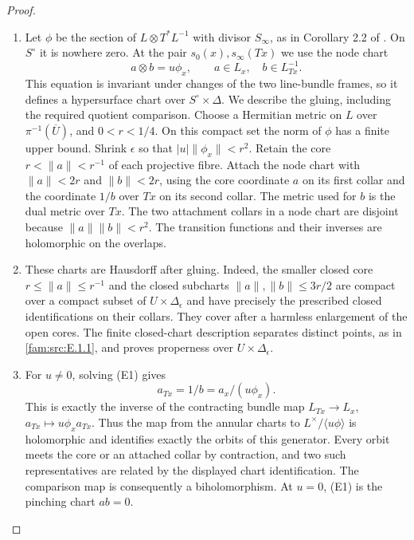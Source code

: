 \begin{proof}
\begin{enumerate}[label=\arabic*.,leftmargin=*]
\item Let $\phi$ be the section of $L\otimes T^*L^{-1}$ with divisor
$S_\infty$, as in Corollary 2.2 of \cite{Engel2026}. On $S^\circ$ it is
nowhere zero. At the pair $s_0(x),s_\infty(Tx)$ we use the node chart
\[
       a\otimes b=u\phi_x,
       \qquad a\in L_x,\quad b\in L^{-1}_{Tx}.                 \tag{E1}
\]
This equation is invariant under changes of the two line-bundle
frames, so it defines a hypersurface chart over $S^\circ\times\Delta$.
We describe the gluing, including the required quotient comparison.
Choose a Hermitian metric on $L$ over $\pi^{-1}(\overline U)$, and
$0<r<1/4$. On this compact set the norm of $\phi$ has a finite upper
bound. Shrink $\epsilon$ so that $|u|\|\phi_x\|<r^2$.
Retain the core $r<\|a\|<r^{-1}$ of each projective fibre. Attach the
node chart with $\|a\|<2r$ and $\|b\|<2r$, using the core coordinate
$a$ on its first collar and the coordinate $1/b$ over $Tx$ on its
second collar. The metric used for $b$ is the dual metric over $Tx$.
The two attachment collars in a node chart are disjoint because
$\|a\|\|b\|<r^2$. The transition functions and their inverses are
holomorphic on the overlaps.

\item These charts are Hausdorff after gluing. Indeed, the smaller closed
core $r\leq\|a\|\leq r^{-1}$ and the closed subcharts
$\|a\|,\|b\|\leq 3r/2$ are compact over a compact subset of
$U\times\Delta_\epsilon$ and have precisely the prescribed closed
identifications on their collars. They cover after a harmless
enlargement of the open cores. The finite closed-chart description
separates distinct points, as in \ref{fam:src:E.1.1}, and proves properness over
$U\times\Delta_\epsilon$.

\item For $u\ne0$, solving (E1) gives
\[
              a_{Tx}=1/b=a_x/(u\phi_x).
\]
This is exactly the inverse of the contracting bundle map
$L_{Tx}\to L_x$, $a_{Tx}\mapsto u\phi_xa_{Tx}$. Thus the map from
the annular charts to $L^\times/\langle u\phi\rangle$ is holomorphic
and identifies exactly the orbits of this generator. Every orbit
meets the core or an attached collar by contraction, and two such
representatives are related by the displayed chart identification.
The comparison map is consequently a biholomorphism. At $u=0$,
(E1) is the pinching chart $ab=0$.


\end{enumerate}
\end{proof}
